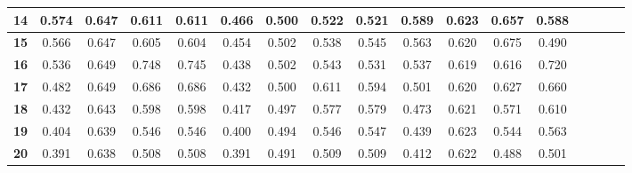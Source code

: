 \begin{table*}[!t]
\begin{tabular}{|c|c|c|c|c|c|c|c|c|c|c|c|c|c|c|c|c|}
\hline
\bfseries 14 & 0.574 & 0.647 & 0.611 & 0.611 & 0.466 & 0.500 & 0.522 & 0.521 & 0.589 & 0.623 & 0.657 & 0.588 \\
\hline
\bfseries 15 & 0.566 & 0.647 & 0.605 & 0.604 & 0.454 & 0.502 & 0.538 & 0.545 & 0.563 & 0.620 & 0.675 & 0.490 \\
\hline
\bfseries 16 & 0.536 & 0.649 & 0.748 & 0.745 & 0.438 & 0.502 & 0.543 & 0.531 & 0.537 & 0.619 & 0.616 & 0.720 \\
\hline
\bfseries 17 & 0.482 & 0.649 & 0.686 & 0.686 & 0.432 & 0.500 & 0.611 & 0.594 & 0.501 & 0.620 & 0.627 & 0.660 \\
\hline
\bfseries 18 & 0.432 & 0.643 & 0.598 & 0.598 & 0.417 & 0.497 & 0.577 & 0.579 & 0.473 & 0.621 & 0.571 & 0.610 \\
\hline
\bfseries 19 & 0.404 & 0.639 & 0.546 & 0.546 & 0.400 & 0.494 & 0.546 & 0.547 & 0.439 & 0.623 & 0.544 & 0.563 \\
\hline
\bfseries 20 & 0.391 & 0.638 & 0.508 & 0.508 & 0.391 & 0.491 & 0.509 & 0.509 & 0.412 & 0.622 & 0.488 & 0.501 \\
\hline
\end{tabular}
\end{table*}

